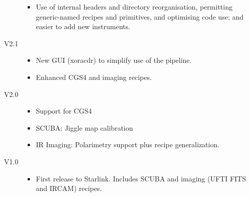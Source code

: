\documentclass[twoside,11pt,nolof]{starlink}
\begin{document}
\begin{description}
\begin{itemize}
\item Use of internal headers and directory reorganisation, permitting
     generic-named recipes and primitives, and optimising code use;
     and easier to add new instruments.

\end{itemize}

\item[V2.1]

\begin{itemize}

\item New GUI (xoracdr) to simplify use of the pipeline.

\item Enhanced CGS4 and imaging recipes.

\end{itemize}

\item[V2.0]

\begin{itemize}

\item Support for CGS4

\item SCUBA: Jiggle map calibration

\item IR Imaging: Polarimetry support plus recipe generalization.

\end{itemize}

\item[V1.0]

\begin{itemize}

\item First release to Starlink. Includes SCUBA and imaging (UFTI FITS
and IRCAM) recipes.

\end{itemize}

\end{description}


\appendix










\end{document}
